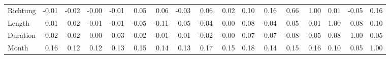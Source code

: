 \begin{tabular}{lrrrrrrrrrrrrrrrr}
Richtung & -0.01 & -0.02 & -0.00 & -0.01 &   0.05 &   0.06 & -0.03 &   0.06 &   0.02 & 0.10 &  0.16 &    0.66 &      1.00 &    0.01 &     -0.05 &   0.16 \\
Length   &  0.01 &  0.02 & -0.01 & -0.01 &  -0.05 &  -0.11 & -0.05 &  -0.04 &   0.00 & 0.08 & -0.04 &    0.05 &      0.01 &    1.00 &      0.08 &   0.10 \\
Duration & -0.02 & -0.02 &  0.00 &  0.03 &  -0.02 &  -0.01 & -0.01 &  -0.02 &  -0.00 & 0.07 & -0.07 &   -0.08 &     -0.05 &    0.08 &      1.00 &   0.05 \\
Month    &  0.16 &  0.12 &  0.12 &  0.13 &   0.15 &   0.14 &  0.13 &   0.17 &   0.15 & 0.18 &  0.14 &    0.15 &      0.16 &    0.10 &      0.05 &   1.00 \\
\bottomrule
\end{tabular}
